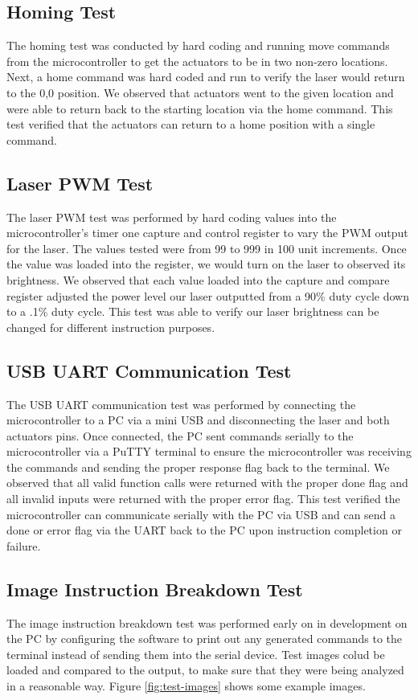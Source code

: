 \documentclass[11pt]{LaTeX-Classes/math-hw}
\begin{document}
\subsection{Homing Test}
The homing test was conducted by hard coding and running move commands from the microcontroller to get the actuators to be in two non-zero locations. Next, a home command was hard coded and run to verify the laser would return to the 0,0 position. We observed that actuators went to the given location and were able to return back to the starting location via the home command. This test verified that the actuators can return to a home position with a single command.  

\subsection{Laser PWM Test}
The laser PWM test was performed by hard coding values into the microcontroller's timer one capture and control register to vary the PWM output for the laser. The values tested were from 99 to 999 in 100 unit increments. Once the value was loaded into the register, we would turn on the laser to observed its brightness. We observed that each value loaded into the capture and compare register adjusted the power level our laser outputted from a 90\% duty cycle down to a .1\% duty cycle. This test was able to verify our laser brightness can be changed for different instruction purposes.
 
\subsection{USB UART Communication Test}
The USB UART communication test was performed by connecting the microcontroller to a PC via a mini USB and disconnecting the laser and both actuators pins. Once connected, the PC sent commands serially to the microcontroller via a PuTTY terminal to ensure the microcontroller was receiving the commands and sending the proper response flag back to the terminal. We observed that all valid function calls were returned with the proper done flag and all invalid inputs were returned with the proper error flag. This test verified the microcontroller can communicate serially with the PC via USB and can send a done or error flag via the UART back to the PC upon instruction completion or failure.

\subsection{Image Instruction Breakdown Test}
The image instruction breakdown test was performed early on in development on the PC by
configuring the software to print out
any generated commands to the terminal instead of sending them into the serial device.
Test images colud be loaded and compared to the output, to make sure that they were being
analyzed in a reasonable way. Figure \ref{fig:test-images} shows some example images. %
\end{document}
